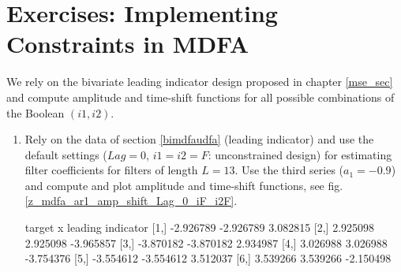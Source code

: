 \documentclass[a4paper]{book}
\begin{document}
\section{Exercises: Implementing Constraints in MDFA}\label{const_impl_mdfa}

We rely on the bivariate leading indicator design proposed in chapter \ref{mse_sec} and compute amplitude and time-shift functions for all possible combinations of the Boolean $(i1,i2)$.

\begin{enumerate}
\item \label{ex_c_1_li} Rely on the data of section \ref{bimdfaudfa} (leading indicator) and use the default settings ($Lag=0$, $i1=i2=F$: unconstrained design) for estimating filter coefficients for filters of length $L=13$. Use the third series ($a_1=-0.9$) and compute and plot amplitude and time-shift functions, see fig.\ref{z_mdfa_ar1_amp_shift_Lag_0_iF_i2F}.
\begin{Schunk}
\begin{Soutput}
        target         x leading indicator
[1,] -2.926789 -2.926789          3.082815
[2,]  2.925098  2.925098         -3.965857
[3,] -3.870182 -3.870182          2.934987
[4,]  3.026988  3.026988         -3.754376
[5,] -3.554612 -3.554612          3.512037
[6,]  3.539266  3.539266         -2.150498
\end{Soutput}
\end{Schunk}


\end{enumerate}
\end{document}
